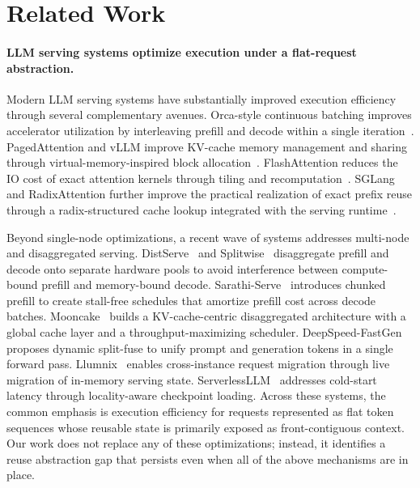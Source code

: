 \documentclass[conference]{IEEEtran}
\begin{document}
\section{Related Work}

\paragraph{LLM serving systems optimize execution under a flat-request abstraction.}
Modern LLM serving systems have substantially improved execution efficiency through several complementary avenues. Orca-style continuous batching improves accelerator utilization by interleaving prefill and decode within a single iteration~\cite{yu2022orca}. PagedAttention and vLLM improve KV-cache memory management and sharing through virtual-memory-inspired block allocation~\cite{kwon2023efficient}. FlashAttention reduces the IO cost of exact attention kernels through tiling and recomputation~\cite{dao2022flashattention,dao2023flashattention2}. SGLang and RadixAttention further improve the practical realization of exact prefix reuse through a radix-structured cache lookup integrated with the serving runtime~\cite{zheng2024sglang,sglang2024radix}.

Beyond single-node optimizations, a recent wave of systems addresses multi-node and disaggregated serving. DistServe~\cite{zhong2024distserve} and Splitwise~\cite{patel2024splitwise} disaggregate prefill and decode onto separate hardware pools to avoid interference between compute-bound prefill and memory-bound decode. Sarathi-Serve~\cite{agrawal2024sarathi} introduces chunked prefill to create stall-free schedules that amortize prefill cost across decode batches. Mooncake~\cite{qin2024mooncake} builds a KV-cache-centric disaggregated architecture with a global cache layer and a throughput-maximizing scheduler. DeepSpeed-FastGen~\cite{holmes2023deepspeed} proposes dynamic split-fuse to unify prompt and generation tokens in a single forward pass. Llumnix~\cite{sun2024llumnix} enables cross-instance request migration through live migration of in-memory serving state. ServerlessLLM~\cite{fu2024serverlessllm} addresses cold-start latency through locality-aware checkpoint loading. Across these systems, the common emphasis is execution efficiency for requests represented as flat token sequences whose reusable state is primarily exposed as front-contiguous context. Our work does not replace any of these optimizations; instead, it identifies a reuse abstraction gap that persists even when all of the above mechanisms are in place.
\end{document}
